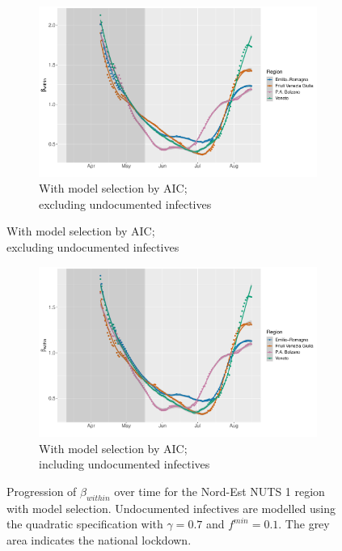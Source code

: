 \documentclass[12pt]{article}
\begin{document}
\begin{appendices}
		\begin{figure}[H]
	    \centering
    	    \begin{subfigure}{\textwidth}
    	      \centering
    	      \includegraphics[width=0.94\linewidth]{output/model_within_lag14_betawithin_Nord-Est_aic_rollingwindow30.pdf}
    	      \caption{With model selection by AIC; \\ excluding undocumented infectives}
    	      \label{fig:beta_within_over_time_nordest_lowsample_aic}
    	    \end{subfigure}
        \end{figure}
        \begin{figure}[H]\ContinuedFloat
    	    \begin{subfigure}{\textwidth}
    	      \centering
    	      \includegraphics[width=0.94\linewidth]{output/model_within_lag14_betawithin_Nord-Est_aic_UndocQuadratic_rollingwindow30.pdf}
    	      \caption{With model selection by AIC; \\ including undocumented infectives}
    	      \label{fig:beta_within_over_time_nordest_lowsample_aic_undoc}
    	    \end{subfigure}
    	    \caption{Progression of $\beta_{within}$ over time for the Nord-Est NUTS 1 region with model selection. Undocumented infectives are modelled using the quadratic specification with $\gamma = 0.7$ and $f^{min}=0.1$. The grey area indicates the national lockdown.}
    	    \label{fig:beta_within_over_time_nordest_lowsample_only_aic}
        \end{figure}
		

\end{appendices}
\end{document}
